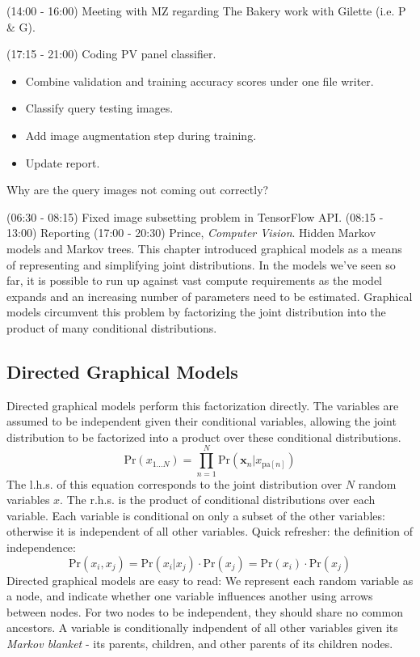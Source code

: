 \documentclass[idxtotoc,hyperref,openany]{labbook} %
\begin{document}
(14:00 - 16:00) Meeting with MZ regarding The Bakery work with Gilette (i.e. P \& G).

(17:15 - 21:00) Coding PV panel classifier.
\begin{itemize}
	\item Combine validation and training accuracy scores under one file writer.
	\item Classify query testing images.
	\item Add image augmentation step during training.
	\item Update report.
\end{itemize}

Why are the query images not coming out correctly?

(06:30 - 08:15) Fixed image subsetting problem in TensorFlow API. 
(08:15 - 13:00) Reporting
(17:00 - 20:30) Prince, \emph{Computer Vision}. Hidden Markov models and Markov trees.
This chapter introduced graphical models as a means of representing and simplifying joint distributions. In the models we've seen so far, it is possible to run up against vast compute requirements as the model expands and an increasing number of parameters need to be estimated. Graphical models circumvent this problem by factorizing the joint distribution into the product of many conditional distributions.
\subsection*{Directed Graphical Models}
Directed graphical models perform this factorization directly. The variables are assumed to be independent given their conditional variables, allowing the joint distribution to be factorized into a product over these conditional distributions.
\[
	\text{Pr}(x_{1...N}) = \prod_{n=1}^{N}\text{Pr}(\mathbf{x}_n | x_{\text{pa}[n]} )
\]
The l.h.s. of this equation corresponds to the joint distribution over $N$ random variables $x$. The r.h.s. is the product of conditional distributions over each variable. Each variable is conditional on only a subset of the other variables: otherwise it is independent of all other variables. Quick refresher: the definition of independence:
\[
	\text{Pr}(x_i, x_j) = \text{Pr}(x_i | x_j) \cdot \text{Pr}(x_j) = \text{Pr}(x_i) \cdot \text{Pr}(x_j)
\]
Directed graphical models are easy to read: We represent each random variable as a node, and indicate whether one variable influences another using arrows between nodes. For two nodes to be independent, they should share no common ancestors. A variable is conditionally indpendent of all other variables given its \emph{Markov blanket} - its parents, children, and other parents of its children nodes.
\end{document}
